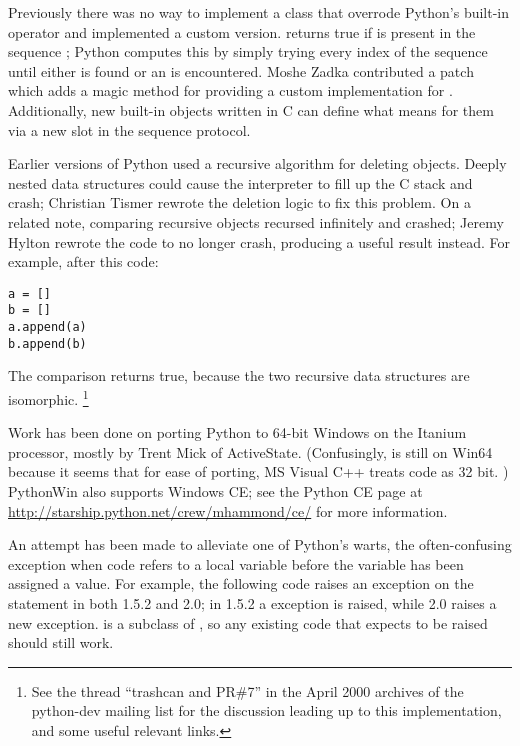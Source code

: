 \documentclass{howto}
\begin{document}
Previously there was no way to implement a class that overrode
Python's built-in  operator and implemented a custom
version.   returns true if  is
present in the sequence ; Python computes this by simply
trying every index of the sequence until either  is found or
an  is encountered.  Moshe Zadka contributed a
patch which adds a  magic method for providing a
custom implementation for . Additionally, new built-in
objects written in C can define what  means for them via a
new slot in the sequence protocol.

Earlier versions of Python used a recursive algorithm for deleting
objects.  Deeply nested data structures could cause the interpreter to
fill up the C stack and crash; Christian Tismer rewrote the deletion
logic to fix this problem.  On a related note, comparing recursive
objects recursed infinitely and crashed; Jeremy Hylton rewrote the
code to no longer crash, producing a useful result instead.  For
example, after this code:

\begin{verbatim}
a = []
b = []
a.append(a)
b.append(b)
\end{verbatim}

The comparison  returns true, because the two recursive
data structures are isomorphic.
\footnote{See the thread ``trashcan and PR\#7'' in the April 2000 archives of the python-dev mailing list for the discussion leading up to this implementation, and some useful relevant links.
}

Work has been done on porting Python to 64-bit Windows on the Itanium
processor, mostly by Trent Mick of ActiveState.  (Confusingly,  is still  on
Win64 because it seems that for ease of porting, MS Visual C++ treats code
as 32 bit.
)  PythonWin also supports Windows CE; see the Python CE page at
\url{http://starship.python.net/crew/mhammond/ce/} for more information.

An attempt has been made to alleviate one of Python's warts, the
often-confusing  exception when code refers to a
local variable before the variable has been assigned a value.  For
example, the following code raises an exception on the 
statement in both 1.5.2 and 2.0; in 1.5.2 a 
exception is raised, while 2.0 raises a new
 exception.
 is a subclass of ,
so any existing code that expects  to be raised
should still work.
\end{document}
